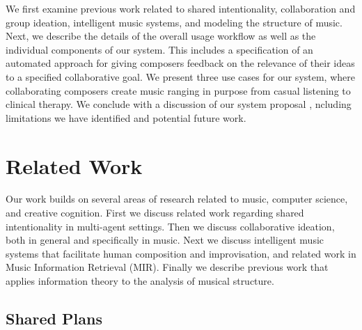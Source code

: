 \documentclass[final,authoryear,5p,times,twocolumn]{elsarticle}
\begin{document}
We first examine previous work related to shared intentionality, collaboration and group ideation, intelligent music systems, and modeling the structure of music. Next, we describe the details of the overall usage workflow as well as the individual components of our system. This includes a specification of an automated approach for giving composers feedback on the relevance of their ideas to a specified collaborative goal. We present three use cases for our system, where collaborating composers create music ranging in purpose from casual listening to clinical therapy. We conclude with a discussion of our system proposal , ncluding limitations we have identified and potential future work.

\section{Related Work}


Our work builds on several areas of research related to music, computer science, and creative cognition. First we discuss related work regarding shared intentionality in multi-agent settings. Then we discuss collaborative ideation, both in general and specifically in music. Next we discuss intelligent music systems that facilitate human composition and improvisation, and related work in Music Information Retrieval (MIR). Finally we describe previous work that applies information theory to the analysis of musical structure.

\subsection{Shared Plans}
\end{document}
